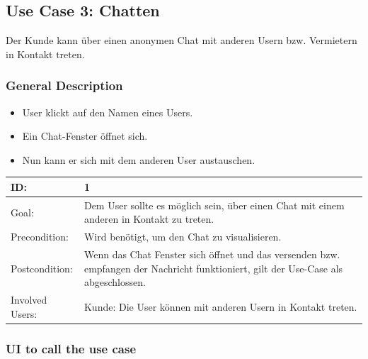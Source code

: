 \documentclass[12pt]{article}
\theoremstyle{definition}
\begin{document}
\subsection{Use Case 3: Chatten}
Der Kunde kann über einen anonymen Chat mit anderen Usern bzw. Vermietern in Kontakt treten.
\subsubsection{General Description}
	\begin{itemize}
		\item User klickt auf den Namen eines Users.
		\item Ein Chat-Fenster öffnet sich.
		\item Nun kann er sich mit dem anderen User austauschen.
	\end{itemize}

\begin{tabular}{|p{.2\linewidth}|p{.65\linewidth}|}
\hline 
ID: & 1 \\ \hline
Goal: & Dem User sollte es möglich sein, über einen Chat mit einem anderen in Kontakt zu treten. \\ \hline
Precondition: & Wird benötigt, um den Chat zu visualisieren. \\ \hline
Postcondition: & Wenn das Chat Fenster sich öffnet und das versenden bzw. empfangen der Nachricht funktioniert, gilt der Use-Case als abgeschlossen. \\ \hline
Involved Users: &Kunde: Die User können mit anderen Usern in Kontakt treten. \\ \hline
\end{tabular}

\subsubsection{UI to call the use case}
\end{document}
